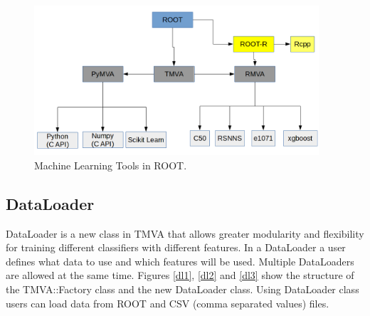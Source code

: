 \documentclass[a4paper]{jpconf}
\begin{document}
\begin{figure}[h]
\centering
\includegraphics[width=25pc]{img/tmva.png}\caption{\label{tmva:label} Machine Learning Tools in ROOT.}
\end{figure}



\subsection{DataLoader}



DataLoader is a new class in TMVA that allows greater
modularity and flexibility for training different classifiers
with different features. In a DataLoader a user defines what data to use and which features will be used. Multiple DataLoaders are allowed at the same time.\newline
Figures \ref{dl1}, \ref{dl2} and \ref{dl3} show the structure of the TMVA::Factory class and the new DataLoader class. Using DataLoader class users can load data from ROOT and CSV (comma separated values) files.
\end{document}
